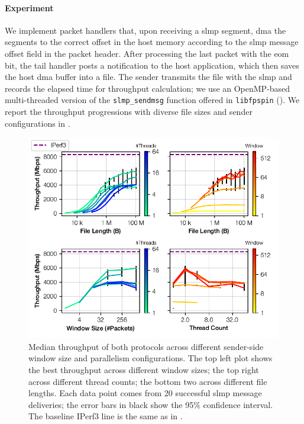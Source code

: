 \paragraph{Experiment} We implement packet handlers that, upon receiving a \ac{slmp} segment, \ac{dma} the segments to the correct offset in the host memory according to the \ac{slmp} message offset field in the packet header.  After processing the last packet with the \ac{eom} bit, the tail handler posts a notification to the host application, which then saves the host \ac{dma} buffer into a file.  The sender transmits the file with the \ac{slmp} and records the elapsed time for throughput calculation; we use an OpenMP-based multi-threaded version of the \texttt{slmp\_sendmsg} function offered in \texttt{libfpspin} ().  We report the throughput progressions with diverse file sizes and sender configurations in .

\begin{figure}[t]
    \centering
    \includegraphics{thesis/figures/slmp-tput.pdf}
    \caption{Median throughput of both protocols across different sender-side window size and parallelism configurations.  The top left plot shows the best throughput across different window sizes; the top right across different thread counts; the bottom two across different file lengths.  Each data point comes from 20 successful \ac{slmp} message deliveries; the error bars in black show the 95\% confidence interval.  The baseline IPerf3 line is the same as in .} \label{fig:slmp-tput}
\end{figure}

